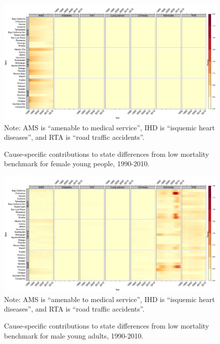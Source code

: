 \documentclass[11.5pt]{article}
\begin{document}
{\begin{figure}
\centering
\caption{Cause-specific contributions to state differences from low mortality benchmark for female young people, 1990-2010.}
\label{fig:e0_14_females}
\includegraphics[scale=.3]{Young_Female_heatmap.pdf}
Note: AMS is ``amenable to medical service'', IHD is ``isquemic heart diseases'', and RTA is ``road traffic accidents''. \end{figure}



\begin{figure}
\centering
\caption{Cause-specific contributions to state differences from low mortality benchmark for male young adults, 1990-2010.}
\label{fig:e15_39_males}
\includegraphics[scale=.3]{YoungAdult_Male_heatmap.pdf}
Note: AMS is ``amenable to medical service'', IHD is ``isquemic heart diseases'', and RTA is ``road traffic accidents''.
\end{figure}

}
\end{document}
